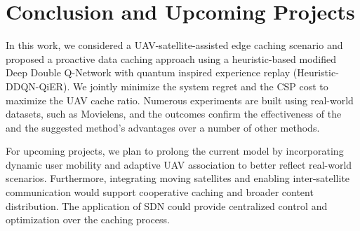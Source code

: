 \documentclass[journal]{IEEEtran}
\begin{document}



\section{Conclusion and Upcoming Projects}
In this work, we considered a UAV-satellite-assisted edge caching scenario and proposed a proactive data caching approach using a heuristic-based modified Deep Double Q-Network with quantum inspired experience replay (Heuristic-DDQN-QiER). We jointly minimize the system regret and the CSP cost to maximize the UAV cache ratio. Numerous experiments are built using real-world datasets, such as Movielens, and the outcomes confirm the effectiveness of the and the suggested method's advantages over a number of other methods.

For upcoming projects, we plan to prolong the current model by incorporating dynamic user mobility and adaptive UAV association to better reflect real-world scenarios. Furthermore, integrating moving satellites and enabling inter-satellite communication would support cooperative caching and broader content distribution. The application of SDN could provide centralized control and optimization over the caching process.



\end{document}
